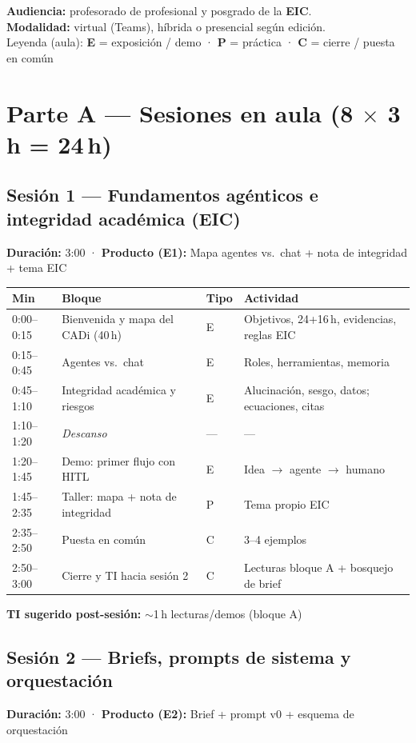 \textbf{Audiencia:} profesorado de profesional y posgrado de la \textbf{EIC}.\\
\textbf{Modalidad:} virtual (Teams), híbrida o presencial según edición.\\
Leyenda (aula): \textbf{E} = exposición / demo · \textbf{P} = práctica · \textbf{C} = cierre / puesta en común

\section{Parte A --- Sesiones en aula (8 $\times$ 3\,h = 24\,h)}

\subsection{Sesión 1 --- Fundamentos agénticos e integridad académica (EIC)}
\textbf{Duración:} 3:00 · \textbf{Producto (E1):} Mapa agentes vs.\ chat + nota de integridad + tema EIC

\begin{tabularx}{\textwidth}{@{}lllX@{}}
\toprule
Min & Bloque & Tipo & Actividad \\
\midrule
0:00--0:15 & Bienvenida y mapa del CADi (40\,h) & E & Objetivos, 24+16\,h, evidencias, reglas EIC \\
0:15--0:45 & Agentes vs.\ chat & E & Roles, herramientas, memoria \\
0:45--1:10 & Integridad académica y riesgos & E & Alucinación, sesgo, datos; ecuaciones, citas \\
1:10--1:20 & \emph{Descanso} & --- & --- \\
1:20--1:45 & Demo: primer flujo con HITL & E & Idea $\rightarrow$ agente $\rightarrow$ humano \\
1:45--2:35 & Taller: mapa + nota de integridad & P & Tema propio EIC \\
2:35--2:50 & Puesta en común & C & 3--4 ejemplos \\
2:50--3:00 & Cierre y TI hacia sesión 2 & C & Lecturas bloque A + bosquejo de brief \\
\bottomrule
\end{tabularx}

\textbf{TI sugerido post-sesión:} $\sim$1\,h lecturas/demos (bloque A)

\subsection{Sesión 2 --- Briefs, prompts de sistema y orquestación}
\textbf{Duración:} 3:00 · \textbf{Producto (E2):} Brief + prompt v0 + esquema de orquestación


